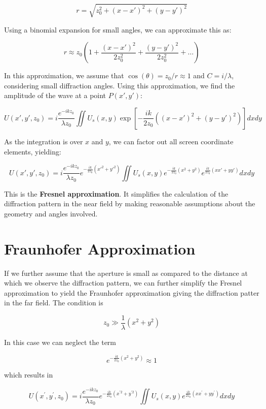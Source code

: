 \documentclass[
  a4paper,
]{book}
\begin{document}
\[
r = \sqrt{z_0^2 + (x - x')^2 + (y - y')^2}
\]

Using a binomial expansion for small angles, we can approximate this as:

\[
r \approx z_0 \left(1 + \frac{(x - x')^2}{2z_0^2} + \frac{(y - y')^2}{2z_0^2} + \ldots \right)
\]

In this approximation, we assume that
\(\cos(\theta) = z_0 / r \approx 1\) and \(C = i / \lambda\),
considering small diffraction angles. Using this approximation, we find
the amplitude of the wave at a point \(P(x',y')\):

\[
U(x', y', z_0) = i \frac{e^{-ikz_0}}{\lambda z_0} \iint U_s(x, y) \exp \left[ -\frac{ik}{2z_0} \left( (x - x')^2 + (y - y')^2 \right) \right] dx dy
\]

As the integration is over \(x\) and \(y\), we can factor out all screen
coordinate elements, yielding:

\[
U(x', y', z_0) = i \frac{e^{-ikz_0}}{\lambda z_0} e^{-\frac{ik}{2z_0}(x'^2 + y'^2)} \iint U_s(x, y) e^{-\frac{ik}{2z_0}(x^2 + y^2)} e^{\frac{ik}{2z_0}(xx' + yy')} dx dy
\]

This is the \textbf{Fresnel approximation}. It simplifies the
calculation of the diffraction pattern in the near field by making
reasonable assumptions about the geometry and angles involved.

\section{Fraunhofer Approximation}\label{fraunhofer-approximation}

If we further assume that the aperture is small as compared to the
distance at which we observe the diffraction pattern, we can further
simplify the Fresnel approximation to yield the Fraunhofer approximation
giving the diffraction patter in the far field. The condition is

\[
z_0\gg\frac{1}{\lambda}(x^2+y^2)
\]

In this case we can neglect the term

\[
e^{ -\frac{ik}{2z_0}(x^2+y^2)} \approx 1
\]

which results in

\[
U(x^{\prime},y^{\prime},z_0)=i\frac{e^{-ikz_0}}{\lambda z_0} e^{-\frac{ik}{2z_0}(x^{\prime 2}+y^{\prime 2})}
\iint U_{s}(x,y)
e^{\frac{ik}{2z_0}(xx^{\prime}+yy^{\prime})} dx dy
\]
\end{document}
